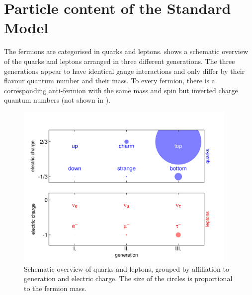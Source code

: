 \section{Particle content of the Standard Model}
\label{sec:sm:particles}
The fermions are categorised in quarks and leptons.  shows a schematic overview of the quarks and leptons arranged in three different generations. The three generations appear to have identical gauge interactions and only differ by their flavour quantum number and their mass. To every fermion, there is a corresponding anti-fermion with the same mass and spin but inverted charge quantum numbers (not shown in ).
\begin{figure}[htbp]
	\centering
	\includegraphics[width=0.95\textwidth]{figures/standardmodel/sm_fermions.pdf}
	\caption{Schematic overview of quarks and leptons, grouped by affiliation to generation and electric charge. The size of the circles is proportional to the fermion mass.}
	\label{fig:sm:fermions}
\end{figure}


